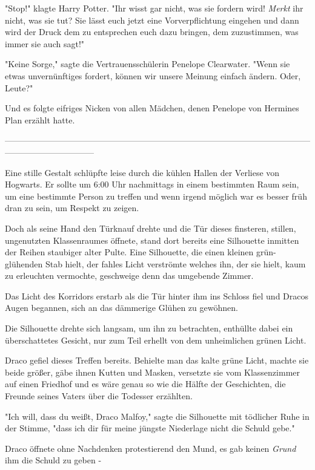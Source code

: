 {"Stop!" klagte Harry Potter. "Ihr wisst gar nicht, was sie fordern wird! \emph{Merkt} ihr nicht, was sie tut? Sie lässt euch jetzt eine Vorverpflichtung eingehen und dann wird der Druck dem zu entsprechen euch dazu bringen, dem zuzustimmen, was immer sie auch sagt!"

"Keine Sorge," sagte die Vertrauensschülerin Penelope Clearwater. "Wenn sie etwas unvernünftiges fordert, können wir unsere Meinung einfach ändern. Oder, Leute?"

Und es folgte eifriges Nicken von allen Mädchen, denen Penelope von Hermines Plan erzählt hatte.

--------------------------------------------------------------------------------------------------------------------------------------------

Eine stille Gestalt schlüpfte leise durch die kühlen Hallen der Verliese von Hogwarts. Er sollte um 6:00 Uhr nachmittags in einem bestimmten Raum sein, um eine bestimmte Person zu treffen und wenn irgend möglich war es besser früh dran zu sein, um Respekt zu zeigen.

Doch als seine Hand den Türknauf drehte und die Tür dieses finsteren, stillen, ungenutzten Klassenraumes öffnete, stand dort bereits eine Silhouette inmitten der Reihen staubiger alter Pulte. Eine Silhouette, die einen kleinen grün-glühenden Stab hielt, der fahles Licht verströmte welches ihn, der sie hielt, kaum zu erleuchten vermochte, geschweige denn das umgebende Zimmer.

Das Licht des Korridors erstarb als die Tür hinter ihm ins Schloss fiel und Dracos Augen begannen, sich an das dämmerige Glühen zu gewöhnen.

Die Silhouette drehte sich langsam, um ihn zu betrachten, enthüllte dabei ein überschattetes Gesicht, nur zum Teil erhellt von dem unheimlichen grünen Licht.

Draco gefiel dieses Treffen bereits. Behielte man das kalte grüne Licht, machte sie beide größer, gäbe ihnen Kutten und Masken, versetzte sie vom Klassenzimmer auf einen Friedhof und es wäre genau so wie die Hälfte der Geschichten, die Freunde seines Vaters über die Todesser erzählten.

"Ich will, dass du weißt, Draco Malfoy," sagte die Silhouette mit tödlicher Ruhe in der Stimme, "dass ich dir für meine jüngste Niederlage nicht die Schuld gebe."

Draco öffnete ohne Nachdenken protestierend den Mund, es gab keinen \emph{Grund} ihm die Schuld zu geben -

}
